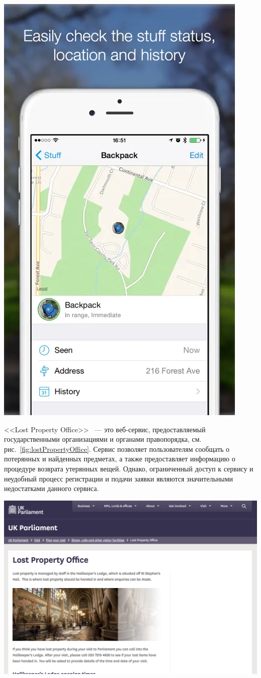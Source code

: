 \documentclass{mirea-article}
\newenvironment{Figure}
{\par\medskip\noindent\minipage{\linewidth}}
{\endminipage\par\medskip}
\begin{document}
\begin{multicols}{2}
		\begin{Figure}
			\centering
			\includegraphics[width=.5\textwidth]{../images/findMyStuff1.png}
			\label{fig:findMyStuff1}
		\end{Figure}
		
		<<Lost Property Office>>~\cite{bib:parliament_lost_and_found} --- это веб-сервис, предоставляемый государственными организациями и органами правопорядка, см. рис.~\ref{fig:lostPropertyOffice}. Сервис позволяет пользователям сообщать о потерянных и найденных предметах, а также предоставляет информацию о процедуре возврата утерянных вещей. Однако, ограниченный доступ к сервису и неудобный процесс регистрации и подачи заявки являются значительными недостатками данного сервиса.
		
		\begin{Figure}
			\centering
			\includegraphics[width=.95\textwidth]{../images/lostPropertyOffice}
			\label{fig:lostPropertyOffice}
		\end{Figure}
	

\end{multicols}
\end{document}
